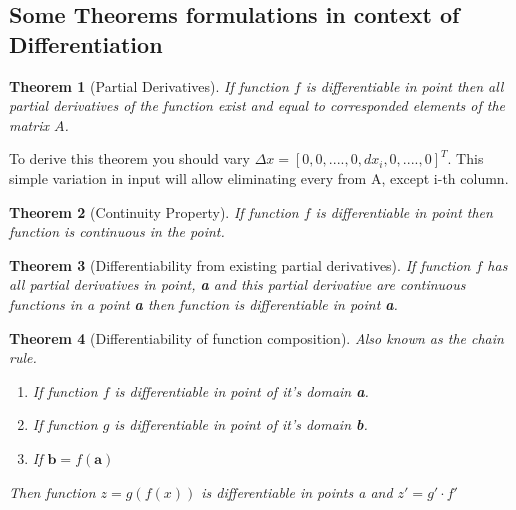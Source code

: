 \documentclass[12pt,a4paper]{article}
\theoremstyle{plain}
\newtheorem{theorem}{Theorem}[section]
\begin{document}
\subsection{Some Theorems formulations in context of Differentiation}
\begin{theorem} [Partial Derivatives]
 If function $f$ is differentiable in point then all partial derivatives of the function exist and equal to corresponded elements of the matrix $A$.
\end{theorem}
To derive this theorem you should vary \textbf{$\varDelta x = [0, 0, ...., 0, dx_i, 0, ...., 0]^T$}.
This simple variation in input will allow eliminating every from A, except i-th column.
\begin{theorem} [Continuity Property]
 If function $f$ is differentiable in point then function is continuous in the point.
\end{theorem}
\begin{theorem} [Differentiability from existing partial derivatives]
 If function $f$ has all partial derivatives in point, \textbf{a} and this partial derivative are continuous functions in a point \textbf{a} then function is differentiable in point \textbf{a}.
\end{theorem}
\begin{theorem} [Differentiability of function composition] Also known as the chain rule.
 \begin{enumerate}
  \item  If function $f$ is differentiable in point of it’s domain \textbf{a}.
  \item  If function $g$ is differentiable in point of it’s domain \textbf{b}.
  \item  If $\textbf{b} = f(\textbf{a})$
 \end{enumerate}
 Then function $z=g(f(x))$ is differentiable in points \textit{a} and 
 $z' = g' \cdot f'$
\end{theorem}
\end{document}

